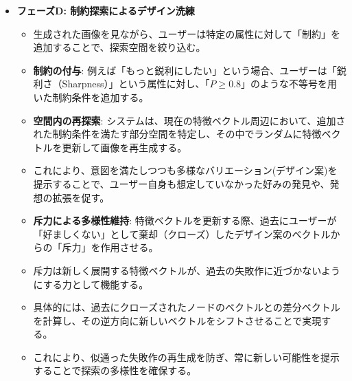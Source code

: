 \documentclass[dvipdfmx]{jlreq}
\begin{document}
\begin{itemize}
  \item \textbf{フェーズD: 制約探索によるデザイン洗練}
  \begin{itemize}
    \item 生成された画像を見ながら、ユーザーは特定の属性に対して「制約」を追加することで、探索空間を絞り込む。
    \item \textbf{制約の付与}: 例えば「もっと鋭利にしたい」という場合、ユーザーは「鋭利さ（Sharpness）」という属性に対し、「$P \ge 0.8$」のような不等号を用いた制約条件を追加する。
    \item \textbf{空間内の再探索}: システムは、現在の特徴ベクトル周辺において、追加された制約条件を満たす部分空間を特定し、その中でランダムに特徴ベクトルを更新して画像を再生成する。
    \item これにより、意図を満たしつつも多様なバリエーション(デザイン案)を提示することで、ユーザー自身も想定していなかった好みの発見や、発想の拡張を促す。
    \item \textbf{斥力による多様性維持}: 特徴ベクトルを更新する際、過去にユーザーが「好ましくない」として棄却（クローズ）したデザイン案のベクトルからの「斥力」を作用させる。
    \item 斥力は新しく展開する特徴ベクトルが、過去の失敗作に近づかないようにする力として機能する。
    \item 具体的には、過去にクローズされたノードのベクトルとの差分ベクトルを計算し、その逆方向に新しいベクトルをシフトさせることで実現する。
    \item これにより、似通った失敗作の再生成を防ぎ、常に新しい可能性を提示することで探索の多様性を確保する。
  \end{itemize}
\end{itemize}
\end{document}
